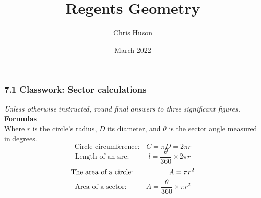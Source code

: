 \documentclass[12pt, twoside]{article}
\title{Regents Geometry}
\author{Chris Huson}
\date{March 2022}
\begin{document}
\subsubsection*{7.1 Classwork: Sector calculations}
\emph{Unless otherwise instructed, round final answers to three significant figures.}\\
\textbf{Formulas}\\
Where $r$ is the circle's radius, $D$ its diameter, and $\theta$ is the sector angle measured in degrees.
  \[\text{Circle circumference: } \;\; C=\pi D = 2\pi r\]
  \[\text{Length of an arc: } \hspace{1cm} l=\frac{\theta}{360} \times 2\pi r\]
  \[\text{The area of a circle: } \hspace{1.6cm}  A=\pi r^2\]
  \[\text{Area of a sector: } \hspace{1cm}  A=\frac{\theta}{360} \times \pi r^2\]
  \vspace{0.25cm}
\end{document}

